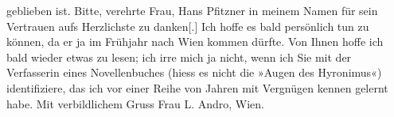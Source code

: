 \begin{ledgroupsized}[t]{13cm}
                    geblieben ist.\pend
           \pstart
           Bitte, verehrte Frau, Hans Pfitzner in meinem
                    Namen für sein Vertrauen aufs Herzlichste zu danken{[}.{]} Ich
                    hoffe es bald persönlich tun zu können, da er ja im Frühjahr nach Wien kommen dürfte. Von Ihnen hoffe ich bald
                    wieder etwas zu lesen; ich irre mich ja nicht, wenn ich Sie mit der Verfasserin
                    eines Novellenbuches (hiess es nicht die »Augen des
                            Hyronimus«) identifiziere, das ich vor
                    einer Reihe von Jahren mit Vergnügen kennen gelernt habe.\pend
           \pstart Mit verbildlichem Gruss\pend{}{\bigskip}\pstart
           \noindent{}Frau L. Andro, Wien.\pend
           
         
         \endnumbering{}\end{ledgroupsized}  \newcommand{\dateiname}{L02574}\newcommand{\titel}{Arthur Schnitzler an Therese Rie-Andro, 12. 2. 1912}\newcommand{\editorInnen}{Martin Anton Müller und Gerd-Hermann Susen}
      